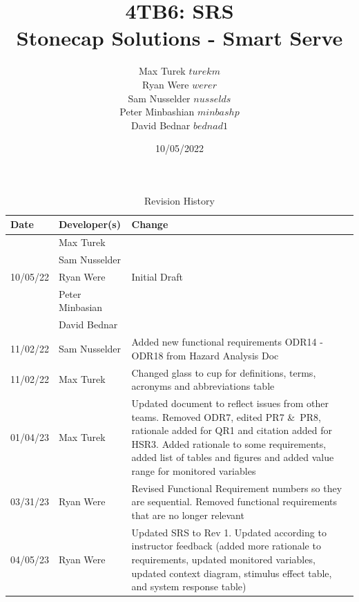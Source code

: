 \documentclass{article}
\title{\textbf{4TB6: SRS}\\
\addlinespace
\addlinespace
\addlinespace
\addlinespace
\large \textbf{Stonecap Solutions - Smart Serve}
\addlinespace
\addlinespace
\addlinespace
\addlinespace}
\author{Max Turek $turekm$\\Ryan Were $werer$\\Sam Nusselder $nusselds$\\Peter Minbashian $minbashp$\\David Bednar $bednad1$}
\date{10/05/2022}
\begin{document}
\maketitle
\newpage
\tableofcontents
\listoffigures
\listoftables

\newpage

    \begin{table}[hp]
    \caption{Revision History} \label{TblRevisionHistory}
    \hline
        \begin{tabularx}{\textwidth}{llX}
        \toprule
        \textbf{Date} & \textbf{Developer(s)} & \textbf{Change}\\
        \midrule
        & Max Turek & \\
        & Sam Nusselder &  \\
        10/05/22 & Ryan Were & Initial Draft\\
        & Peter Minbasian & \\
        & David Bednar & \\
        \bottomrule
        \hline
        \toprule
        \midrule
        11/02/22 & Sam Nusselder & Added new functional requirements ODR14 - ODR18 from Hazard Analysis Doc\\
        \bottomrule
        \hline
        \toprule
        \midrule
        11/02/22 & Max Turek & Changed glass to cup for definitions, terms, acronyms and abbreviations table \\
        \bottomrule
        \hline
        \toprule
        \midrule
        01/04/23 & Max Turek & Updated document to reflect issues from other teams. Removed ODR7, edited PR7 \&\ PR8, rationale added for QR1 and citation added for HSR3. Added rationale to some requirements, added list of tables and figures and added value range for monitored variables\\
        \bottomrule
        \hline
         03/31/23 & Ryan Were & Revised Functional Requirement numbers so they are sequential. Removed functional requirements that are no longer relevant\\
        \hline
         04/05/23 & Ryan Were & Updated SRS to Rev 1. Updated according to instructor feedback (added more rationale to requirements, updated monitored variables, updated context diagram, stimulus effect table, and system response table)\\
        \hline
        \end{tabularx}
    \end{table}
\end{document}
